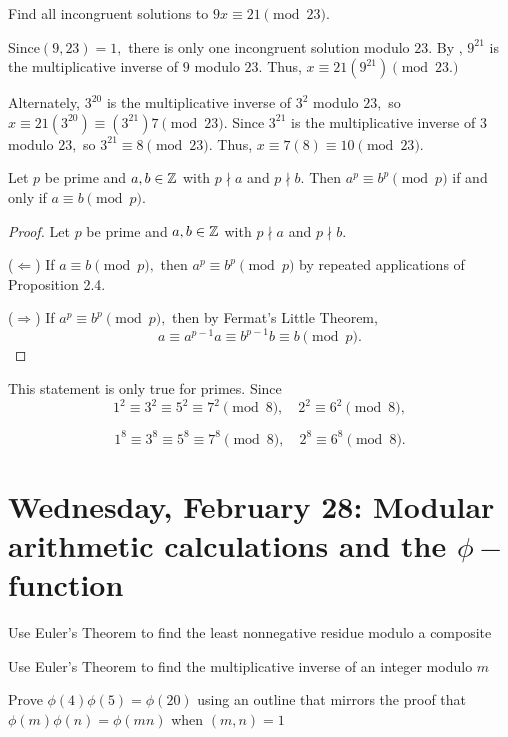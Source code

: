 \documentclass[letterpaper, 11 pt]{ximera}
\begin{document}
\begin{example}
 Find all incongruent solutions to $9x\equiv 21\pmod{23}$.
 
Since$(9,23)=1,$ there is only one  incongruent solution  modulo $23.$ By , $9^{21}$ is the multiplicative inverse of $9$ modulo ${23}$. Thus, $x\equiv 21(9^{21})\pmod{23.}$

Alternately, $3^{20}$ is the multiplicative inverse of $3^2$ modulo ${23},$ so $x\equiv 21(3^{20})\equiv  (3^{21})7\pmod{23}.$ Since $3^{21}$ is the multiplicative inverse of $3$ modulo $23,$ so $3^{21}\equiv 8\pmod{23}.$ Thus, $x\equiv 7(8)\equiv 10\pmod{23}.$
\end{example}

\begin{example}
 Let $p$ be prime and $a,b\in\mathbb Z$ with $p\nmid a$ and $p\nmid b.$ Then $a^p\equiv b^p\pmod{p}$ if and only if $a\equiv b\pmod{p}$.
 
 
\begin{proof}
  Let $p$ be prime and $a,b\in\mathbb Z$ with $p\nmid a$ and $p\nmid b.$ 
  
  ($\Leftarrow$) If $a\equiv  b\pmod{p},$ then $a^p\equiv b^p\pmod{p}$ by repeated applications of Proposition 2.4.
  
  ($\Rightarrow$)  If $a^p\equiv  b^p\pmod{p},$ then by Fermat's Little Theorem, 
  \[a\equiv a^{p-1}a\equiv b^{p-1}b\equiv b\pmod p. \]
\end{proof}
\begin{warning}
 This statement is only true for primes. Since
\[
 1^2\equiv 3^2\equiv 5^2\equiv 7^2\pmod{8},\quad 2^2\equiv 6^2\pmod{8},
 \]
 
\[
 1^8\equiv 3^8\equiv 5^8\equiv 7^8\pmod{8},\quad  2^8\equiv 6^8\pmod{8}.
\]
\end{warning}
\end{example}

\section{Wednesday, February 28: Modular arithmetic calculations and the $\phi-$ function}

\begin{obj}
\item Use Euler's Theorem to find the least nonnegative residue modulo a composite
\item Use Euler's Theorem to find the multiplicative inverse of an integer modulo $m$
\item Prove $\phi(4)\phi(5)=\phi(20)$ using an outline that mirrors the proof that $\phi(m)\phi(n)=\phi(mn)$ when $(m,n)=1$
\end{obj}
\end{document}
